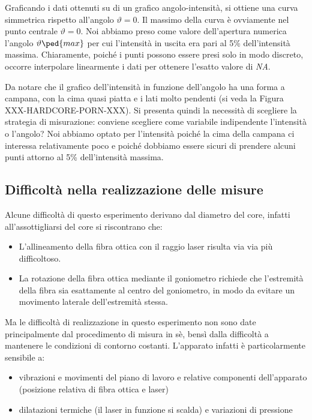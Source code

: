 Graficando i dati ottenuti su di un grafico angolo-intensità, si ottiene una curva simmetrica rispetto all'angolo $\vartheta = 0$.
Il massimo della curva è ovviamente nel punto centrale $\vartheta = 0$. Noi abbiamo preso come valore dell'apertura numerica
l'angolo $\vartheta\ped{max}$ per cui l'intensità in uscita era pari al 5\% dell'intensità massima. Chiaramente, poiché i punti
possono essere presi solo in modo discreto, occorre interpolare linearmente i dati per ottenere l'esatto valore di \emph{NA}.

Da notare che il grafico dell'intensità in funzione dell'angolo ha una forma a campana, con la cima quasi piatta e i lati molto pendenti
(si veda la Figura XXX-HARDCORE-PORN-XXX). Si presenta quindi la necessità di scegliere la strategia di misurazione: conviene
scegliere come variabile indipendente l'intensità o l'angolo? Noi abbiamo optato per l'intensità poiché la cima della campana
ci interessa relativamente poco e poiché dobbiamo essere sicuri di prendere alcuni punti attorno al 5\% dell'intensità massima.


\subsection{Difficoltà nella realizzazione delle misure}

Alcune difficoltà di questo esperimento derivano dal diametro del core, infatti all'assottigliarsi del core si riscontrano che:
\begin{itemize}
    \item{L'allineamento della fibra ottica con il raggio laser risulta via via più difficoltoso.}
    \item{La rotazione della fibra ottica mediante il goniometro richiede che l'estremità della fibra sia esattamente
        al centro del goniometro, in modo da evitare un movimento laterale dell'estremità stessa.}
\end{itemize}
Ma le difficoltà di realizzazione in questo esperimento non sono date principalmente dal procedimento di misura in sè, bensì dalla difficoltà a mantenere le condizioni di contorno costanti. L'apparato infatti è particolarmente sensibile a:
\begin{itemize}
	\item{vibrazioni e movimenti del piano di lavoro e relative componenti dell'apparato (posizione relativa di fibra ottica e laser)}
	\item{dilatazioni termiche (il laser in funzione si scalda) e variazioni di pressione}
\end{itemize}

